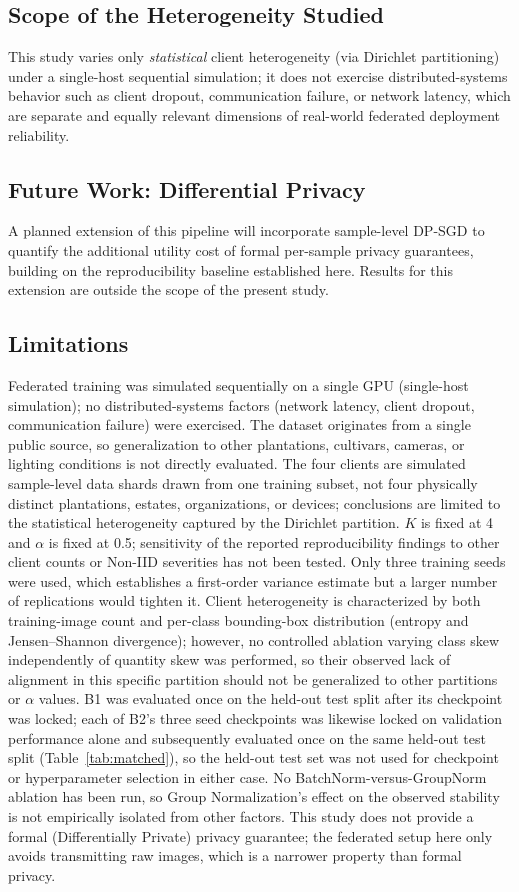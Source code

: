 \documentclass[11pt]{article}
\begin{document}
\subsection*{Scope of the Heterogeneity Studied}
This study varies only \emph{statistical} client heterogeneity (via Dirichlet partitioning) under a single-host sequential simulation; it does not exercise distributed-systems behavior such as client dropout, communication failure, or network latency, which are separate and equally relevant dimensions of real-world federated deployment reliability.

\subsection*{Future Work: Differential Privacy}
A planned extension of this pipeline will incorporate sample-level DP-SGD \cite{abadi2016} to quantify the additional utility cost of formal per-sample privacy guarantees, building on the reproducibility baseline established here. Results for this extension are outside the scope of the present study.

\subsection*{Limitations}
Federated training was simulated sequentially on a single GPU (single-host simulation); no distributed-systems factors (network latency, client dropout, communication failure) were exercised. The dataset originates from a single public source, so generalization to other plantations, cultivars, cameras, or lighting conditions is not directly evaluated. The four clients are simulated sample-level data shards drawn from one training subset, not four physically distinct plantations, estates, organizations, or devices; conclusions are limited to the statistical heterogeneity captured by the Dirichlet partition. $K$ is fixed at 4 and $\alpha$ is fixed at 0.5; sensitivity of the reported reproducibility findings to other client counts or Non-IID severities has not been tested. Only three training seeds were used, which establishes a first-order variance estimate but a larger number of replications would tighten it. Client heterogeneity is characterized by both training-image count and per-class bounding-box distribution (entropy and Jensen--Shannon divergence); however, no controlled ablation varying class skew independently of quantity skew was performed, so their observed lack of alignment in this specific partition should not be generalized to other partitions or $\alpha$ values. B1 was evaluated once on the held-out test split after its checkpoint was locked; each of B2's three seed checkpoints was likewise locked on validation performance alone and subsequently evaluated once on the same held-out test split (Table~\ref{tab:matched}), so the held-out test set was not used for checkpoint or hyperparameter selection in either case. No BatchNorm-versus-GroupNorm ablation has been run, so Group Normalization's effect on the observed stability is not empirically isolated from other factors. This study does not provide a formal (Differentially Private) privacy guarantee; the federated setup here only avoids transmitting raw images, which is a narrower property than formal privacy.
\end{document}
